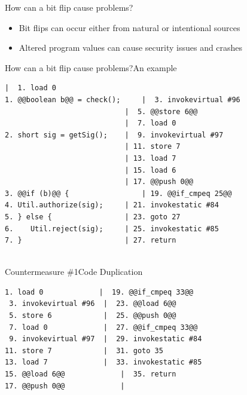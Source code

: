


\begin{frame}[fragile]{How can a bit flip cause problems?}
	\begin{itemize}
		\item Bit flips can occur either from natural or intentional sources
		\item Altered program values can cause security issues and crashes
	\end{itemize}
\end{frame}


\begin{frame}[fragile]{How can a bit flip cause problems?}{An example}
  \begin{lstlisting}[numbers=none, moredelim={[is][keywordstyle]{@@}{@@}}]
                            |  1. load 0               
1. @@boolean b@@ = check();     |  3. invokevirtual #96     
                            |  5. @@store 6@@              
                            |  7. load 0
2. short sig = getSig();    |  9. invokevirtual #97
                            | 11. store 7
                            | 13. load 7
                            | 15. load 6
                            | 17. @@push 0@@               
3. @@if (b)@@ {                 | 19. @@if_cmpeq 25@@               
4. Util.authorize(sig);     | 21. invokestatic #84
5. } else {                 | 23. goto 27
6.    Util.reject(sig);     | 25. invokestatic #85
7. }                        | 27. return                  
                           
\end{lstlisting}
\end{frame}

\begin{frame}[fragile]{Countermeasure \#1}{Code Duplication}
  \begin{lstlisting}[numbers=none, moredelim={[is][keywordstyle]{@@}{@@}}]       
 1. load 0             |  19. @@if_cmpeq 33@@
 3. invokevirtual #96  |  23. @@load 6@@  
 5. store 6            |  25. @@push 0@@
 7. load 0             |  27. @@if_cmpeq 33@@ 	
 9. invokevirtual #97  |  29. invokestatic #84
11. store 7            |  31. goto 35
13. load 7             |  33. invokestatic #85
15. @@load 6@@             |  35. return 
17. @@push 0@@             |                         
\end{lstlisting}
\end{frame}

